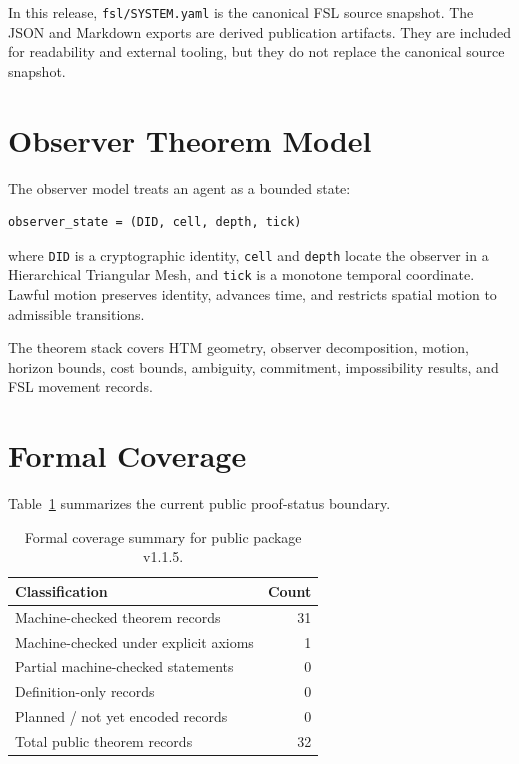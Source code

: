 \documentclass[11pt]{article}
\begin{document}
In this release, \texttt{fsl/SYSTEM.yaml} is the canonical FSL source snapshot. The JSON and Markdown exports are derived publication artifacts. They are included for readability and external tooling, but they do not replace the canonical source snapshot.

\section{Observer Theorem Model}

The observer model treats an agent as a bounded state:

\begin{lstlisting}
observer_state = (DID, cell, depth, tick)
\end{lstlisting}

\noindent where \texttt{DID} is a cryptographic identity, \texttt{cell} and \texttt{depth} locate the observer in a Hierarchical Triangular Mesh, and \texttt{tick} is a monotone temporal coordinate. Lawful motion preserves identity, advances time, and restricts spatial motion to admissible transitions.

The theorem stack covers HTM geometry, observer decomposition, motion, horizon bounds, cost bounds, ambiguity, commitment, impossibility results, and FSL movement records.

\section{Formal Coverage}

Table~\ref{tab:coverage} summarizes the current public proof-status boundary.

\begin{table}[h]
\centering
\begin{tabular}{lr}
\toprule
Classification & Count \\
\midrule
Machine-checked theorem records & 31 \\
Machine-checked under explicit axioms & 1 \\
Partial machine-checked statements & 0 \\
Definition-only records & 0 \\
Planned / not yet encoded records & 0 \\
\midrule
Total public theorem records & 32 \\
\bottomrule
\end{tabular}
\caption{Formal coverage summary for public package v1.1.5.}
\label{tab:coverage}
\end{table}
\end{document}
